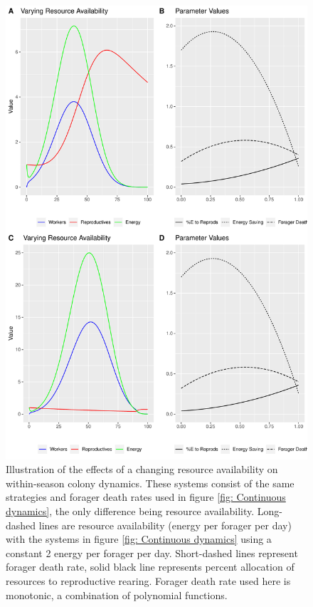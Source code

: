 \documentclass[12pt]{report}
\begin{document}
\begin{figure}[t!]
\centering
\includegraphics{FinalProject-VarKPlot}
\caption{Illustration of the effects of a changing resource availability on within-season colony dynamics. These systems consist of the same strategies and forager death rates used in figure \ref{fig: Continuous dynamics}, the only difference being resource availability. Long-dashed lines are resource availability (energy per forager per day) with the systems in figure \ref{fig: Continuous dynamics} using a constant 2 energy per forager per day. Short-dashed lines represent forager death rate, solid black line represents percent allocation of resources to reproductive rearing. Forager death rate used here is monotonic, a combination of polynomial functions.}
\label{fig: Continuous dynamics 2}
\end{figure}
\end{document}
